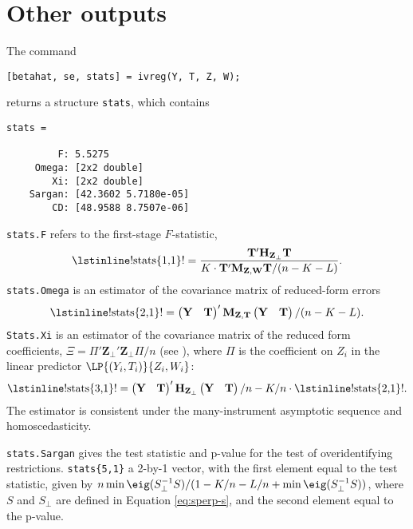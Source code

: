 \documentclass{mynotes}
\newcommand{\by}{\mathbf{Y}} %
\newcommand{\bt}{\mathbf{T}} %
\newcommand{\bz}{\mathbf{Z}} %
\newcommand{\bw}{\mathbf{W}} %
\newcommand{\Hm}[1]{\mathbf{H}_{#1}} %
\newcommand{\Mm}[1]{\mathbf{M}_{#1}} %
\begin{document}
\section{Other outputs}
The command
\begin{lstlisting}
[betahat, se, stats] = ivreg(Y, T, Z, W);
\end{lstlisting}
returns a structure \lstinline!stats!, which contains
\begin{lstlisting}
stats =

         F: 5.5275
     Omega: [2x2 double]
        Xi: [2x2 double]
    Sargan: [42.3602 5.7180e-05]
        CD: [48.9588 8.7507e-06]
\end{lstlisting}
\lstinline!stats.F! refers to the first-stage $F$-statistic,
\begin{equation*}
  \text{\lstinline!stats\{1,1\}!} = \frac{\bt'\Hm{\bz_{\perp}}\bt}{K \cdot\bt'\Mm{\bz,\bw}\bt /(n-K-L)}.
\end{equation*}
\lstinline!stats.Omega! is an estimator of the covariance matrix of reduced-form
errors
\begin{equation*}
  \text{\lstinline!stats\{2,1\}!}=
  \begin{pmatrix}
    \by&\bt
  \end{pmatrix}' \Mm{\bz,\bt} \begin{pmatrix}
    \by&\bt
  \end{pmatrix}/(n-K-L).
\end{equation*}
\lstinline!Stats.Xi! is an estimator of the covariance matrix of the reduced form
coefficients, $\Xi=\Pi'\bz_{\perp}'\bz_{\perp}\Pi/n$ (see
\citet{kolesar12late}), where $\Pi$ is the coefficient on $Z_{i}$ in the linear
predictor $\LP{(Y_{i},T_{i})}{Z_{i},W_{i}}$:
\begin{equation*}
  \text{\lstinline!stats\{3,1\}!}=
  \begin{pmatrix}
    \by&\bt
  \end{pmatrix}' \Hm{\bz_{\perp}} \begin{pmatrix}
    \by&\bt
  \end{pmatrix}/n-K/n\cdot     \text{\lstinline!stats\{2,1\}!}.
\end{equation*}
The estimator is consistent under the many-instrument asymptotic sequence and
homoscedasticity.

\lstinline!stats.Sargan! gives the test statistic and p-value for the
\citet{sargan58} test of overidentifying restrictions. \lstinline!stats{5,1}! a
2-by-1 vector, with the first element equal to the test statistic, given by
$n\min\eig(S_{\perp}^{-1}S)/(1-K/n-L/n+\min\eig(S_{\perp}^{-1}S))$, where $S$
and $S_{\perp}$ are defined in Equation \eqref{eq:sperp-s}, and the second
element equal to the p-value.
\end{document}
